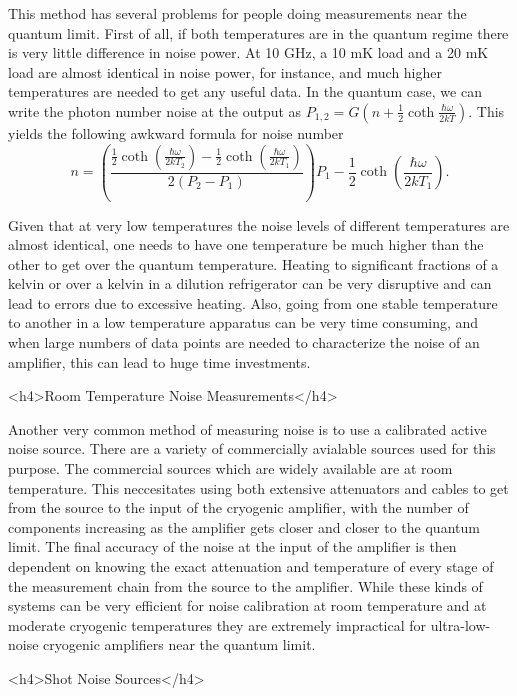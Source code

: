 \documentclass[11pt]{article}
\begin{document}
	This method has several problems for people doing measurements near the quantum limit.  First of all, if both temperatures are in the quantum regime there is very little difference in noise power.  At 10 GHz, a 10 mK load and a 20 mK load are almost identical in noise power, for instance, and much higher temperatures are needed to get any useful data.  In the quantum case, we can write the photon number noise at the output as $P_{1,2} = G(n + \frac{1}{2}\coth{\frac{\hbar\omega}{2kT}})$.  This yields the following awkward formula for noise number
$$n = \left(\frac{\frac{1}{2}\coth{\left(\frac{\hbar\omega}{2kT_2}\right)} - \frac{1}{2}\coth{\left(\frac{\hbar\omega}{2kT_1}\right)}}{2(P_2 - P_1)}\right)P_1 - \frac{1}{2}\coth{\left(\frac{\hbar\omega}{2kT_1}\right)}.$$



	Given that at very low temperatures the noise levels of different temperatures are almost identical, one needs to have one temperature be much higher than the other to get over the quantum temperature.  Heating to significant fractions of a kelvin or over a kelvin in a dilution refrigerator can be very disruptive and can lead to errors due to excessive heating.  Also, going from one stable temperature to another in a low temperature apparatus can be very time consuming, and when large numbers of data points are needed to characterize the noise of an amplifier, this can lead to huge time investments.  

<h4>Room Temperature Noise Measurements</h4>


	
	Another very common method of measuring noise is to use a calibrated active noise source.  There are a variety of commercially avialable sources used for this purpose.  The commercial sources which are widely available are at room temperature.  This neccesitates using both extensive attenuators and cables to get from the source to the input of the cryogenic amplifier, with the number of components increasing as the amplifier gets closer and closer to the quantum limit.  The final accuracy of the noise at the input of the amplifier is then dependent on knowing the exact attenuation and temperature of every stage of the measurement chain from the source to the amplifier.  While these kinds of systems can be very efficient for noise calibration at room temperature and at moderate cryogenic temperatures they are extremely impractical for ultra-low-noise cryogenic amplifiers near the quantum limit.  

	<h4>Shot Noise Sources</h4>
	
\end{document}
